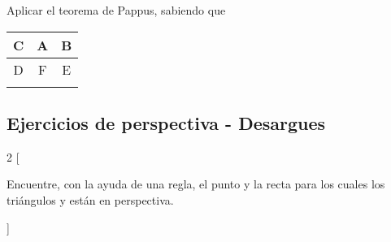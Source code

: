 \begin{section-exercise}
    Aplicar el teorema de Pappus, sabiendo que
    \begin{tabular}{|c|c|c|}
        \hline
        C & A & B\\\hline
        D & F & E\\
        \hline \hline
        &&\\
        \hline
    \end{tabular}
    \begin{figure}[H]
        \centering
        
    \end{figure}
\end{section-exercise}


\newpage
\subsection{Ejercicios de perspectiva - Desargues}

\begin{multicols}{2}
    [
        \begin{section-exercise}
            Encuentre, con la ayuda de una regla, el punto y la recta para los cuales los triángulos  y  están en perspectiva.
        \end{section-exercise}
    ]

    \begin{figure}[H]
        \centering
        
    \end{figure}

    \begin{figure}[H]
        \centering
        
    \end{figure}

    \begin{figure}[H]
        \centering
        
    \end{figure}

    \begin{figure}[H]
        \centering
        
    \end{figure}

\end{multicols}